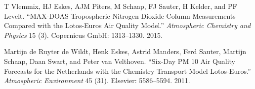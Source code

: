 \documentclass[9pt]{report}
\begin{document}
{\begin{thebibliography}{34}
T Vlemmix, HJ Eskes, AJM Piters, M Schaap, FJ Sauter, H Kelder, and PF Levelt. \textquotedblleft{}MAX-DOAS Tropospheric Nitrogen Dioxide Column Measurements Compared with the Lotos-Euros Air Quality Model.\textquotedblright{} \emph{Atmospheric Chemistry and Physics} 15 (3). Copernicus GmbH: 1313–1330. 2015.\label{vlemmix2015max}%

Martijn de Ruyter de Wildt, Henk Eskes, Astrid Manders, Ferd Sauter, Martijn Schaap, Daan Swart, and Peter van Velthoven. \textquotedblleft{}Six-Day PM 10 Air Quality Forecasts for the Netherlands with the Chemistry Transport Model Lotos-Euros.\textquotedblright{} \emph{Atmospheric Environment} 45 (31). Elsevier: 5586–5594. 2011.\label{de2011six}%
\par%
\end{thebibliography}}%
\end{document}
